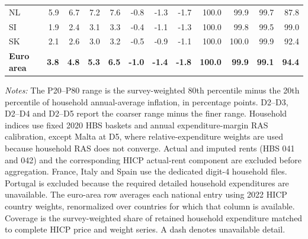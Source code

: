 \begin{table}[!htbp]
{\begin{tabular}[t]{lrrrrrrrrrrr}
NL & 5.9 & 6.7 & 7.2 & 7.6 & -0.8 & -1.3 & -1.7 & 100.0 & 99.9 & 99.7 & 87.8\\
SI & 1.9 & 2.4 & 3.1 & 3.3 & -0.4 & -1.1 & -1.3 & 100.0 & 99.8 & 99.5 & 99.0\\
SK & 2.1 & 2.6 & 3.0 & 3.2 & -0.5 & -0.9 & -1.1 & 100.0 & 100.0 & 99.9 & 92.4\\
\addlinespace
\textbf{Euro area} & \textbf{3.8} & \textbf{4.8} & \textbf{5.3} & \textbf{6.5} & \textbf{-1.0} & \textbf{-1.4} & \textbf{-1.8} & \textbf{100.0} & \textbf{99.9} & \textbf{99.1} & \textbf{94.4}\\
\bottomrule
\end{tabular}}

\begin{flushleft}
\scriptsize{\emph{Notes:} The P20--P80 range is the survey-weighted 80th percentile minus the 20th percentile of household annual-average inflation, in percentage points. D2--D3, D2--D4 and D2--D5 report the coarser range minus the finer range. Household indices use fixed 2020 HBS baskets and annual expenditure-margin RAS calibration, except Malta at D5, where relative-expenditure weights are used because household RAS does not converge. Actual and imputed rents (HBS 041 and 042) and the corresponding HICP actual-rent component are excluded before aggregation. France, Italy and Spain use the dedicated digit-4 household files. Portugal is excluded because the required detailed household expenditures are unavailable. The euro-area row averages each national entry using 2022 HICP country weights, renormalized over countries for which that column is available. Coverage is the survey-weighted share of retained household expenditure matched to complete HICP price and weight series. A dash denotes unavailable detail.}
\end{flushleft}
\end{table}
